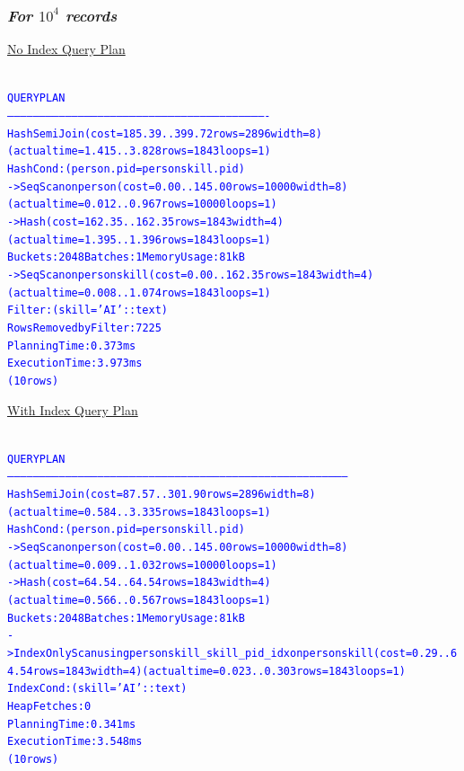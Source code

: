 \documentclass{article}
\begin{document}
    \subsubsection*{\emph{For $10^4$ records}}
    \underline{No Index Query Plan}
    \begin{center}
      {\tiny
      \begin{alltt}
      \textcolor{blue}{
        QUERY PLAN                                                        
        -------------------------------------------------------------------------------------------------------------------------
         Hash Semi Join  (cost=185.39..399.72 rows=2896 width=8) (actual time=1.415..3.828 rows=1843 loops=1)
           Hash Cond: (person.pid = personskill.pid)
           ->  Seq Scan on person  (cost=0.00..145.00 rows=10000 width=8) (actual time=0.012..0.967 rows=10000 loops=1)
           ->  Hash  (cost=162.35..162.35 rows=1843 width=4) (actual time=1.395..1.396 rows=1843 loops=1)
                 Buckets: 2048  Batches: 1  Memory Usage: 81kB
                 ->  Seq Scan on personskill  (cost=0.00..162.35 rows=1843 width=4) (actual time=0.008..1.074 rows=1843 loops=1)
                       Filter: (skill = 'AI'::text)
                       Rows Removed by Filter: 7225
         Planning Time: 0.373 ms
         Execution Time: 3.973 ms
        (10 rows)
       }
      \end{alltt}
      }
    \end{center}
    \underline{With Index Query Plan}
    \begin{center}
      {\tiny
      \begin{alltt}
      \textcolor{blue}{
        QUERY PLAN                                                                           
        ---------------------------------------------------------------------------------------------------------------------------------------------------------------
         Hash Semi Join  (cost=87.57..301.90 rows=2896 width=8) (actual time=0.584..3.335 rows=1843 loops=1)
           Hash Cond: (person.pid = personskill.pid)
           ->  Seq Scan on person  (cost=0.00..145.00 rows=10000 width=8) (actual time=0.009..1.032 rows=10000 loops=1)
           ->  Hash  (cost=64.54..64.54 rows=1843 width=4) (actual time=0.566..0.567 rows=1843 loops=1)
                 Buckets: 2048  Batches: 1  Memory Usage: 81kB
                 ->  Index Only Scan using personskill_skill_pid_idx on personskill  (cost=0.29..64.54 rows=1843 width=4) (actual time=0.023..0.303 rows=1843 loops=1)
                       Index Cond: (skill = 'AI'::text)
                       Heap Fetches: 0
         Planning Time: 0.341 ms
         Execution Time: 3.548 ms
        (10 rows)
       }
      \end{alltt}
      }
    \end{center}
\end{document}
